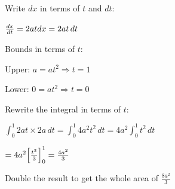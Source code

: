 \documentclass[../main.tex]{subfiles}
\begin{document}
\begin{enumerate}
\begin{spacing}{1.5}
    Write $dx$ in terms of $t$ and $dt$:

    $\frac{dx}{dt}=2at\\
    dx=2at\,dt$

    Bounds in terms of $t$:

    Upper: $a=at^2 \Rightarrow t=1$

    Lower: $0=at^2 \Rightarrow t=0$

    Rewrite the integral in terms of $t$:

    $\int_0^1 2at\times 2a\,dt=\int_0^1 4a^2t^2\,dt=4a^2\int_0^1 t^2\,dt$

    $=4a^2\Bigl[\frac{t^3}{3}\Bigr]_0^1=\frac{4a^2}{3}$

    Double the result to get the whole area of $\frac{8a^2}{3}$



\end{spacing}  
\end{enumerate}
\end{document}
